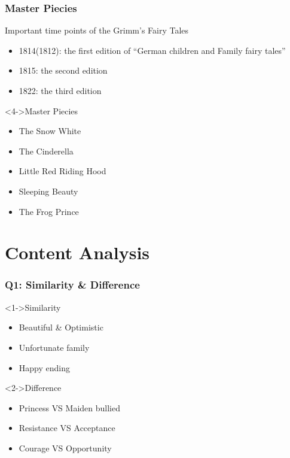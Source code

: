\documentclass{beamer}
\begin{document}
\begin{frame}
    \frametitle{Master Piecies}
    \begin{block}{Important time points of the Grimm's Fairy Tales}
        \begin{itemize}
            \item<1-> 1814(1812): the first edition of ``German children and Family fairy tales''
            \item<2-> 1815: the second edition
            \item<3-> 1822: the third edition %
        \end{itemize}
    \end{block}
    \begin{block}<4->{Master Piecies}
        \begin{itemize}
            \item<5-> \alert{The Snow White}
            \item<5-> \alert{The Cinderella}
            \item<4-> Little Red Riding Hood
            \item<4-> Sleeping Beauty
            \item<4-> The Frog Prince
        \end{itemize}
    \end{block}
\end{frame}

\section{Content Analysis}

\begin{frame}
    \frametitle{Q1: Similarity \& Difference}
    \begin{block}<1->{Similarity}
        \begin{itemize}
            \item Beautiful \& Optimistic
            \item Unfortunate family
            \item Happy ending
        \end{itemize}
    \end{block}
    \begin{block}<2->{Difference}
        \begin{itemize}
            \item Princess \alert{VS} Maiden bullied
            \item Resistance \alert{VS} Acceptance
            \item Courage \alert{VS} Opportunity
        \end{itemize}
    \end{block}
\end{frame}
\end{document}
